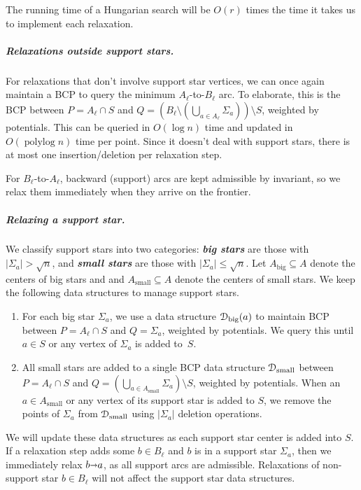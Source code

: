 \documentclass[a4paper,UKenglish]{socg-lipics-v2018}
\def\polylog{\mathop{\mathrm{polylog}}}
\def\abs#1{\mathopen| #1 \mathclose|}		%
\def\arcto{\mathord\shortrightarrow}
\def\arc#1#2{#1\arcto#2}
\theoremstyle{plain}
\numberwithin{figure}{section}
\renewcommand{\paragraph}{\subparagraph}
\def\EMPH#1{\textbf{\emph{\boldmath #1}}}
\begin{document}
The running time of a Hungarian search will be $O(r)$ times the time it takes
us to implement each relaxation.

\paragraph{Relaxations outside support stars.}
For relaxations that don't involve support star vertices, we can once again
maintain a BCP to query the minimum $A_\ell$-to-$B_\ell$ arc.
To elaborate, this is the BCP between $P = A_\ell \cap S$ and
$Q = (B_\ell \setminus (\bigcup_{a \in A_\ell} \Sigma_a)) \setminus S$,
weighted by potentials.
This can be queried in $O(\log n)$ time and updated in $O(\polylog n)$ time per
point.
Since it doesn't deal with support stars, there is at most one
insertion/deletion per relaxation step.

For $B_\ell$-to-$A_\ell$, backward (support) arcs are kept admissible by
invariant, so we relax them immediately when they arrive on the frontier.

\paragraph{Relaxing a support star.}
We classify support stars into two categories: \EMPH{big stars} are those with
$\abs{\Sigma_a} > \sqrt{n}$, and \EMPH{small stars} are those with
$\abs{\Sigma_a} \leq \sqrt{n}$.
Let $A_\text{big} \subseteq A$ denote the centers of big stars and
and $A_\text{small} \subseteq A$ denote the centers of small stars.
We keep the following data structures to manage support stars.
\begin{enumerate}
\item For each big star $\Sigma_a$, we use a data structure
	$\EuScript{D}_\text{big}(a)$ to maintain BCP between
	$P = A_\ell \cap S$ and $Q = \Sigma_a$, weighted by potentials.
	We query this until $a \in S$ or any vertex of $\Sigma_a$ is added to~$S$.
\item All small stars are added to a single BCP data structure
	$\EuScript{D}_\text{small}$ between $P = A_\ell \cap S$ and
	$Q = (\bigcup_{a \in A_\text{small}} \Sigma_a) \setminus S$, weighted by
	potentials.
	When an $a \in A_\text{small}$ or any vertex of its support star is
	added to $S$, we remove the points of $\Sigma_a$ from
	$\EuScript{D}_\text{small}$ using $\abs{\Sigma_a}$ deletion operations.
\end{enumerate}
We will update these data structures as each support star center is added into
$S$.
If a relaxation step adds some $b \in B_\ell$ and $b$ is in a support star
$\Sigma_a$, then we immediately relax $\arc ba$, as all support arcs are
admissible.
Relaxations of non-support star $b \in B_\ell$ will not affect the support star
data structures.
\end{document}

